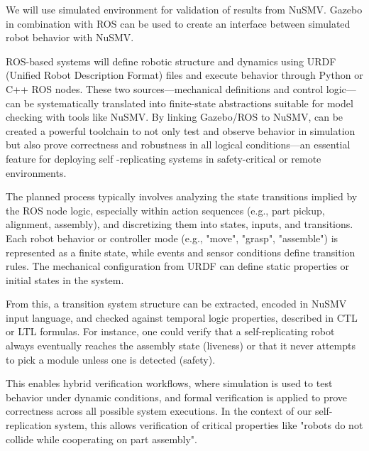 We will use simulated environment for validation of results from NuSMV.
Gazebo in combination with ROS can be used to create an interface between
simulated robot behavior with  NuSMV. 

ROS-based systems will define robotic structure and dynamics using URDF (Unified 
Robot Description Format) files and execute behavior through Python or C++ ROS 
nodes. 
These two sources—mechanical definitions and control logic—can be systematically 
translated into finite-state abstractions suitable for model checking with tools 
like NuSMV.
By linking Gazebo/ROS to NuSMV, can be created a powerful toolchain to not 
only test and observe behavior in simulation but also prove correctness and 
robustness in all logical conditions—an essential feature for deploying self
-replicating systems in safety-critical or remote environments.

The planned process typically involves analyzing the state transitions implied by the 
ROS node logic, especially within action sequences (e.g., part pickup, alignment,
assembly), and discretizing them into states, inputs, and transitions. Each 
robot behavior or controller mode (e.g., "move", "grasp", "assemble") is 
represented as a finite state, while events and sensor conditions define transition 
rules. The mechanical configuration from URDF can define static properties or 
initial states in the system.

From this, a transition system structure can be extracted, encoded 
in NuSMV input language, and checked against temporal logic properties, described in 
CTL or LTL formulas. 
For instance, one could verify that a self-replicating 
robot always eventually reaches the assembly state (liveness) or that it never 
attempts to pick a module unless one is detected (safety).


This  enables hybrid verification workflows, where simulation is used 
to test behavior under dynamic conditions, and formal verification is applied 
to prove correctness across all possible system executions. In the context of 
our self-replication system, this allows verification of critical properties 
like  "robots do not collide while cooperating on part assembly".




